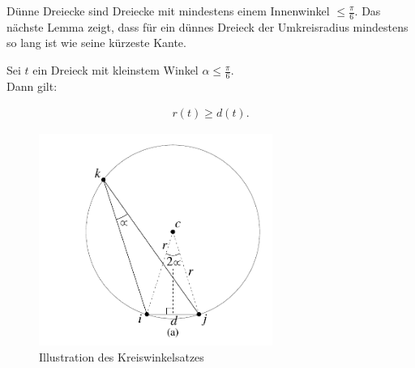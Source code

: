 Dünne Dreiecke sind Dreiecke mit mindestens einem Innenwinkel $\leq \frac{\pi}{6}$.  
Das nächste Lemma zeigt, dass für ein dünnes Dreieck der Umkreisradius mindestens so lang ist wie seine kürzeste Kante.


   




\begin{lemma}
\label{le:dünnes_dreieck}
Sei $t$ ein Dreieck mit kleinstem Winkel $\alpha \leq \frac{\pi}{6}$.\\
Dann gilt: 
 
 \begin{align*}
     r(t) \geq d(t).
 \end{align*} 
 \end{lemma}

\begin{figure}[h]
    \centering
    \includegraphics[width=3in]{images/Kreiswinkelsatz.png}
    \caption{Illustration des Kreiswinkelsatzes \cite{shewchuk:1997:delaunay}}
    \label{fig:kreiswinkelsatz}
\end{figure}


